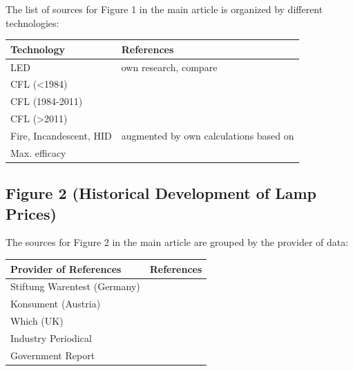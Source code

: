\documentclass[10pt]{article}
\begin{document}
The list of sources for Figure 1 in the main article is organized by different technologies:

\begin{table}[h!]
    \begin{tabularx}{\textwidth}{|l|X|}
    \hline
    \textbf{Technology} & \textbf{References} \\
    \hline
    LED & own research, compare \cite{zenodo_weinold_led_history} \\
    \hline
    CFL (<1984) & \cite{Bouwknegt1982}\cite{Vrenken1983} \\
    \hline
    CFL (1984-2011) & \cite{eger2018origin} \\
    \hline
    CFL (>2011) & \cite{Guan2015} \\
    \hline
    Fire, Incandescent, HID & \cite{azevedo2009transition} augmented by own calculations based on \cite{benesch1905beleuchtungswesen} \\
    \hline
    Max. efficacy & \cite{Murphy2012} \\
    \hline
    \end{tabularx}
\end{table}

\subsection{Figure 2 (Historical Development of Lamp Prices)}

The sources for Figure 2 in the main article are grouped by the provider of data:

\begin{table}[h!]
    \begin{tabularx}{\textwidth}{|l|X|}
    \hline
    \textbf{Provider of References} & \textbf{References} \\
    \hline
    Stiftung Warentest (Germany) & \cite{Warentest2008}\cite{Warentest2009_1}\cite{Warentest2009_2}\cite{Warentest2010_1}\cite{Warentest2010_2}\cite{Warentest2011}\cite{Warentest2012}\cite{Warentest2013}\cite{Warentest2014_1}\cite{Warentest2014_2}\cite{Warentest2015}\cite{Warentest2016_1}\cite{Warentest2016_2}\cite{Warentest2018} \\
    \hline
    Konsument (Austria) & \cite{Konsument2010} \\
    \hline
    Which (UK) & \cite{Which2020} \\
    \hline
    Industry Periodical & \cite{PM2020} \\
    \hline
    Government Report & \cite{council2013assessment} \\
    \hline
    \end{tabularx}
\end{table}
\end{document}

